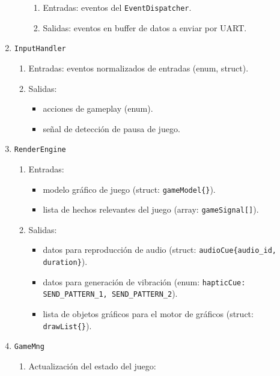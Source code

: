 \documentclass[11pt,a4paper]{article}
\begin{document}
\begin{enumerate}
\begin{enumerate}
\begin{enumerate}
        \item Entradas: eventos del \texttt{EventDispatcher}.
        \item Salidas: eventos en buffer de datos a enviar por UART.
      \end{enumerate}
    \end{enumerate}
  \item \texttt{InputHandler}
    \begin{enumerate}
      \item Entradas: eventos normalizados de entradas (enum, struct).
      \item Salidas: 
      \begin{itemize}
        \item acciones de gameplay (enum).
        \item señal de detección de pausa de juego.
      \end{itemize}
    \end{enumerate}
  \item \texttt{RenderEngine}
    \begin{enumerate}
      \item Entradas: 
      \begin{itemize}
        \item modelo gráfico de juego (struct: \texttt{gameModel\{\}}).
        \item lista de hechos relevantes del juego (array: \texttt{gameSignal[]}).
      \end{itemize}
      \item Salidas: 
      \begin{itemize}
        \item datos para reproducción de audio (struct: \texttt{audioCue\{audio\_id, duration\}}).
        \item datos para generación de vibración (enum: \texttt{hapticCue: SEND\_PATTERN\_1, SEND\_PATTERN\_2}).
        \item lista de objetos gráficos para el motor de gráficos (struct: \texttt{drawList\{\}}).
      \end{itemize}
    \end{enumerate}
  \item \texttt{GameMng}
    \begin{enumerate}
      \item Actualización del estado del juego:

\end{enumerate}
\end{enumerate}
\end{document}

